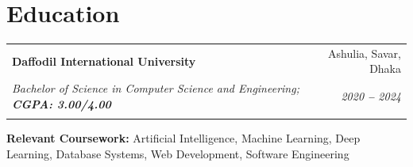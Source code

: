 \documentclass[letterpaper,11pt]{article}
\makeatletter
\newcommand{\resumeEducationHeading}[6]{
  \vspace{-3pt}\item %
    \begin{tabular*}{0.97\textwidth}[t]{l@{\extracolsep{\fill}}r}
      \textbf{#1} & #2 \\
      \textit{\small#3} & \textit{\small #4} \\
      \textit{\small#5} & \textit{\small #6} \\
    \end{tabular*}\vspace{-6pt} %
}
\newcommand{\resumeSubHeadingListStart}{\begin{itemize}[leftmargin=0.15in, label={}]}
\newcommand{\resumeSubHeadingListEnd}{\end{itemize}}
\makeatother
\begin{document}

\section{Education}
  \vspace{-2pt} %
  \resumeSubHeadingListStart
    
    \resumeEducationHeading
      {Daffodil International University}{Ashulia, Savar, Dhaka}
      {Bachelor of Science in Computer Science and Engineering;   \textbf{CGPA: 3.00/4.00}}{2020 \textbf{--} 2024}
      {}{}
        \resumeSubHeadingListStart
        \small{\item{
            \textbf{Relevant Coursework:} Artificial Intelligence, Machine Learning, Deep Learning, Database Systems, Web Development, Software Engineering
        }}
        \resumeSubHeadingListEnd
    
  \resumeSubHeadingListEnd



\end{document}
